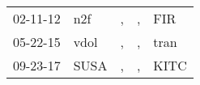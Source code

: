 \begin{supertabular}{lllll}
 02-11-12 &   n2f &  , &  , &   FIR \\
 05-22-15 &  vdol &  , &  , &  tran \\
 09-23-17 &  SUSA &  , &  , &  KITC \\
\end{supertabular}

